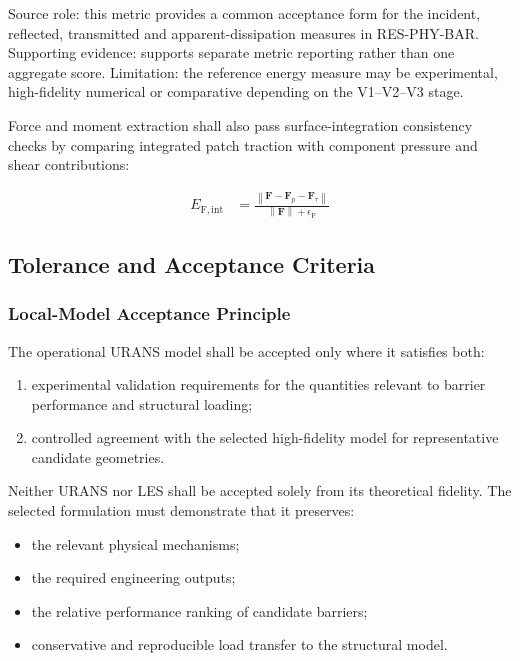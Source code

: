 Source role: this metric provides a common acceptance form for the
incident, reflected, transmitted and apparent-dissipation measures in
RES-PHY-BAR. Supporting evidence: \textcite{watanabe2022validation}
supports separate metric reporting rather than one aggregate score.
Limitation: the reference energy measure may be experimental,
high-fidelity numerical or comparative depending on the V1--V2--V3
stage.

Force and moment extraction shall also pass surface-integration
consistency checks by comparing integrated patch traction with
component pressure and shear contributions:

\begin{align}
  E_{\mathrm{F,int}}
  &=
  \frac{
    \left\lVert
      \mathbf{F}
      -
      \mathbf{F}_{p}
      -
      \mathbf{F}_{\tau}
    \right\rVert
  }{
    \left\lVert
      \mathbf{F}
    \right\rVert
    +
    \epsilon_{\mathrm{F}}
  }
  \label{eq:res-ver-met-force-integration-consistency}
\end{align}

\subsection{Tolerance and Acceptance Criteria}
\label{sec:res-ver-met-tolerance-acceptance-criteria}


\subsubsection{Local-Model Acceptance Principle}
\label{sec:res-ver-met-local-acceptance-principle}

The operational URANS model shall be accepted only where it satisfies
both:

\begin{enumerate}
  \item experimental validation requirements for the quantities
    relevant to barrier performance and structural loading;
  \item controlled agreement with the selected high-fidelity model
    for representative candidate geometries.
\end{enumerate}

Neither URANS nor LES shall be accepted solely from its theoretical
fidelity. The selected formulation must demonstrate that it preserves:

\begin{itemize}
  \item the relevant physical mechanisms;
  \item the required engineering outputs;
  \item the relative performance ranking of candidate barriers;
  \item conservative and reproducible load transfer to the structural
    model.
\end{itemize}

